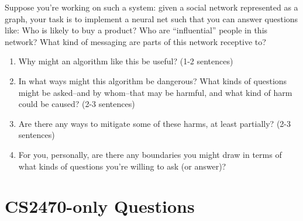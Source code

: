 \documentclass{article}
\begin{document}
Suppose you’re working on such a system: given a social network represented as a graph, your task is to implement a neural net such that you can answer questions like: 
Who is likely to buy a product?
Who are “influential” people in this network?
What kind of messaging are parts of this network receptive to?
\begin{enumerate}

    \item Why might an algorithm like this be useful? (1-2 sentences)
    \item In what ways might this algorithm be dangerous? What kinds of questions might be asked--and by whom--that may be harmful, and what kind of harm could be caused? (2-3 sentences)
    \item Are there any ways to mitigate some of these harms, at least partially? (2-3 sentences)
    \item For you, personally, are there any boundaries you might draw in terms of what kinds of questions you’re willing to ask (or answer)? 

\end{enumerate}

\section{CS2470-only Questions}
\end{document}
